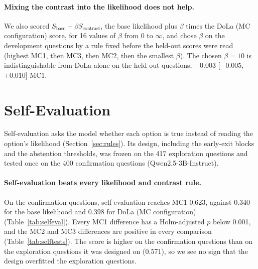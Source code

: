 \documentclass[11pt]{article}
\newcommand{\mainmodel}{Qwen2.5-3B-Instruct}
\begin{document}
\paragraph{Mixing the contrast into the likelihood does not help.}
We also scored $S_{\text{base}} + \beta S_{\text{contrast}}$, the base likelihood plus $\beta$ times the DoLa (MC
configuration) score, for 16 values of $\beta$ from 0 to $\infty$, and chose $\beta$ on the development questions
by a rule fixed before the held-out scores were read (highest MC1, then MC3, then MC2, then the smallest $\beta$).
The chosen $\beta = 10$ is indistinguishable from DoLa alone on the held-out questions, $+0.003$ [$-0.005$, $+0.010$]
MC1.

\section{Self-Evaluation}
\label{sec:selfeval}

Self-evaluation asks the model whether each option is true instead of reading the option's likelihood
(Section~\ref{sec:rules}). Its design, including the early-exit blocks and the abstention thresholds, was frozen on
the 417 exploration questions and tested once on the 400 confirmation questions (\mainmodel{}).

\paragraph{Self-evaluation beats every likelihood and contrast rule.}
On the confirmation questions, self-evaluation reaches MC1 0.623, against 0.340 for the base likelihood and 0.398
for DoLa (MC configuration) (Table~\ref{tab:selfeval}). Every MC1 difference has a Holm-adjusted $p$ below 0.001,
and the MC2 and MC3 differences are positive in every comparison (Table~\ref{tab:selftests}). The score is higher on
the confirmation questions than on the exploration questions it was designed on (0.571), so we see no sign that the
design overfitted the exploration questions.

\begin{table}[t]
\centering\small\setlength{\tabcolsep}{3.5pt}
\caption{Self-evaluation and the likelihood and contrast rules on the exploration and confirmation questions
(\mainmodel{}). For the self-evaluation rows, MC2 uses the log-odds of Equation~\eqref{eq:selfeval} in place of the
log-likelihood; the token-count baseline has no MC2. Matched pairs: length-matched pairwise accuracy as in
Table~\ref{tab:length}. Length correlation: mean within-question rank correlation with the option's token count.}
\label{tab:selfeval}
\end{table}
\end{document}
